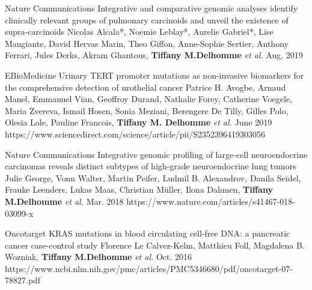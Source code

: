 \begin{cventries}
  \cvpublicationentry
    {Nature Communications} %
    {Integrative and comparative genomic analyses identify clinically relevant groups of pulmonary carcinoids and unveil the existence of supra-carcinoids} %
    {Nicolas Alcala*, Noemie Leblay*, Aurelie Gabriel*, Lise Mangiante, David Hervas Marin, Theo Giffon, Anne-Sophie Sertier, Anthony Ferrari, Jules Derks, Akram Ghantous, \textbf{Tiffany M.Delhomme} \textit{et al.}} %
    {}
    {Aug. 2019} %
    {}

  \cvpublicationentry
    {EBioMedicine} %
    {Urinary TERT promoter mutations as non-invasive biomarkers for the comprehensive detection of urothelial cancer} %
    {Patrice H. Avogbe, Arnaud Manel, Emmanuel Vian, Geoffroy Durand, Nathalie Forey, Catherine Voegele, Maria Zvereva, Ismail Hosen, Sonia Meziani, Berengere De Tilly, Gilles Polo, Olesia Lole, Pauline Francois, \textbf{Tiffany M. Delhomme} \textit{et al.}} %
    {}
    {June 2019} %
    {https://www.sciencedirect.com/science/article/pii/S2352396419303056}

  \cvpublicationentry
    {Nature Communications} %
    {Integrative genomic profiling of large-cell neuroendocrine carcinomas reveals distinct subtypes of high-grade neuroendocrine lung tumors} %
    {Julie George, Vonn Walter, Martin Peifer, Ludmil B. Alexandrov, Danila Seidel, Frauke Leenders, Lukas Maas, Christian Müller, Ilona Dahmen, \textbf{Tiffany M.Delhomme} \textit{et al.}} %
    {}
    {Mar. 2018} %
    {https://www.nature.com/articles/s41467-018-03099-x}

  \cvpublicationentry
    {Oncotarget} %
    {KRAS mutations in blood circulating cell-free DNA: a pancreatic
cancer case-control study} %
    {Florence Le Calvez-Kelm, Matthieu Foll, Magdalena B. Wozniak, \textbf{Tiffany M.Delhomme} \textit{et al.}} %
    {}
    {Oct. 2016} %
    {https://www.ncbi.nlm.nih.gov/pmc/articles/PMC5346680/pdf/oncotarget-07-78827.pdf}


\end{cventries}
